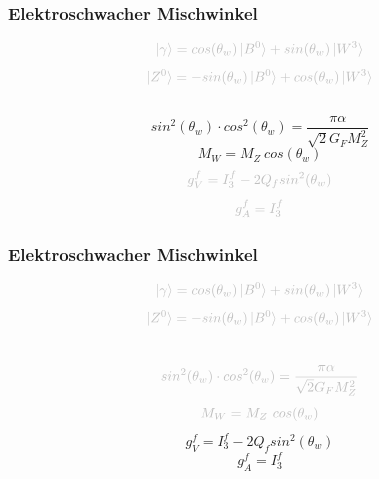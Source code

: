 \begin{frame}
	\frametitle{Elektroschwacher Mischwinkel}
	\begin{center}
		\begin{equation*}
		\textcolor{lightgray}{\ket{\gamma} =  cos(\theta_w)\ket{B^0} + sin(\theta_w) \ket{W^3}}
		\end{equation*}
		\begin{equation*}
		\textcolor{lightgray}{\ket{Z^0} = -sin(\theta_w) \ket{B^0} + cos(\theta_w) \ket{W^3}}
		\end{equation*}
		\\
		\begin{equation*}
		sin^2(\theta_w)\cdot cos^2(\theta_w) = \frac{\pi\alpha}{\sqrt{2}G_FM_Z^2}
		\end{equation*}
		\begin{equation*}
		M_W = M_Z~cos(\theta_w)
		\end{equation*}
		\begin{equation*}
			\textcolor{lightgray}{g_V^f = I^f_3-2 Q_f sin^2(\theta_w)}
		\end{equation*}
		\begin{equation*}
			\textcolor{lightgray}{g_A^f = I^f_3}
		\end{equation*}
	\end{center}
\end{frame}

\begin{frame}
	\frametitle{Elektroschwacher Mischwinkel}
	\begin{center}
		\begin{equation*}
		\textcolor{lightgray}{\ket{\gamma} =  cos(\theta_w)\ket{B^0} + sin(\theta_w) \ket{W^3}}
		\end{equation*}
		\begin{equation*}
		\textcolor{lightgray}{\ket{Z^0} = -sin(\theta_w) \ket{B^0} + cos(\theta_w) \ket{W^3}}
		\end{equation*}
		\\
		\begin{equation*}
		\textcolor{lightgray}{sin^2(\theta_w)\cdot cos^2(\theta_w) = \frac{\pi\alpha}{\sqrt{2}G_FM_Z^2}}
		\end{equation*}
		\begin{equation*}
		\textcolor{lightgray}{M_W = M_Z~cos(\theta_w)}
		\end{equation*}
		\begin{equation*}
		g_V^f = I^f_3-2 Q_f sin^2(\theta_w)
		\end{equation*}
		\begin{equation*}
		g_A^f = I^f_3
		\end{equation*}
	\end{center}
\end{frame}

